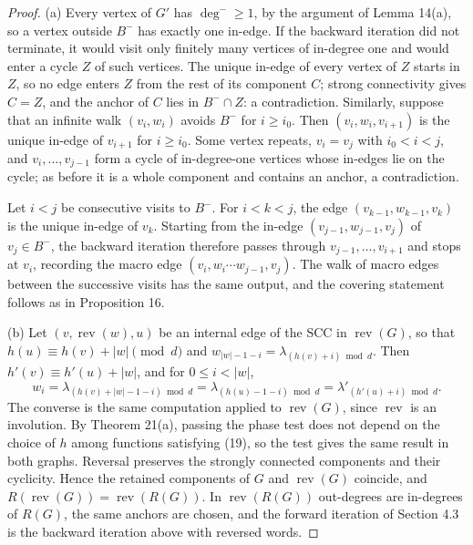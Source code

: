 \documentclass[11pt,reqno]{amsart}
\theoremstyle{definition}
\theoremstyle{remark}
\begin{document}
\begin{proof}\leavevmode\label{proof:75}
(a) Every vertex of \(G'\) has \(\deg^-\ge1\), by the argument of
Lemma 14(a), so a vertex outside \(B^-\) has exactly one in-edge. If the
backward iteration did not terminate, it would visit only
finitely many vertices of in-degree one and would enter a cycle \(Z\) of
such vertices. The unique in-edge of every vertex of \(Z\) starts in
\(Z\), so no edge enters \(Z\) from the rest of its component \(C\);
strong connectivity gives \(C=Z\), and the anchor of \(C\) lies in
\(B^-\cap Z\): a contradiction. Similarly, suppose that an infinite walk
\((v_i,w_i)\) avoids \(B^-\) for \(i\ge i_0\). Then
\((v_i,w_i,v_{i+1})\) is the unique in-edge of \(v_{i+1}\) for
\(i\ge i_0\). Some vertex repeats, \(v_i=v_j\) with \(i_0<i<j\), and
\(v_i,\ldots,v_{j-1}\) form a cycle of in-degree-one vertices whose
in-edges lie on the cycle; as before it is a whole component and contains
an anchor, a contradiction.

Let \(i<j\) be consecutive visits to \(B^-\). For \(i<k<j\), the edge
\((v_{k-1},w_{k-1},v_k)\) is the unique in-edge of \(v_k\). Starting from
the in-edge \((v_{j-1},w_{j-1},v_j)\) of \(v_j\in B^-\), the backward
iteration therefore passes through \(v_{j-1},\ldots,v_{i+1}\) and stops
at \(v_i\), recording the macro edge
\((v_i,w_i\cdots w_{j-1},v_j)\). The walk of macro edges between the
successive visits has the same output, and the covering statement follows
as in Proposition 16.

(b) Let \((v,\operatorname{rev}(w),u)\) be an internal edge of the SCC
in \(\operatorname{rev}(G)\), so that \(h(u)\equiv h(v)+|w|\pmod d\) and
\(w_{|w|-1-i}=\lambda_{(h(v)+i)\bmod d}\). Then
\(h'(v)\equiv h'(u)+|w|\), and for \(0\le i<|w|\),
\[
w_i=\lambda_{(h(v)+|w|-1-i)\bmod d}=\lambda_{(h(u)-1-i)\bmod d}
=\lambda'_{(h'(u)+i)\bmod d}.
\]
The converse is the same computation applied to \(\operatorname{rev}(G)\),
since \(\operatorname{rev}\) is an involution. By Theorem 21(a), passing
the phase test does not depend on the choice of \(h\) among functions
satisfying (19), so the test gives the same result in both graphs. Reversal preserves the
strongly connected components and their cyclicity. Hence the retained
components of \(G\) and \(\operatorname{rev}(G)\) coincide, and
\(R(\operatorname{rev}(G))=\operatorname{rev}(R(G))\). In
\(\operatorname{rev}(R(G))\) out-degrees are in-degrees of \(R(G)\), the
same anchors are chosen, and the forward iteration of Section 4.3 is the
backward iteration above with reversed words. \qedhere
\end{proof}
\end{document}
